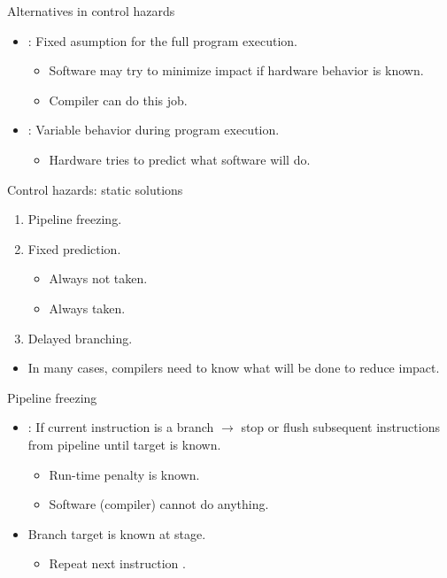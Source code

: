 \begin{frame}[t]{Alternatives in control hazards}
\begin{itemize}
  \item {}: Fixed asumption for the full program execution.
    \begin{itemize}
      \item Software may try to minimize impact if hardware behavior is known.
      \item Compiler can do this job.
    \end{itemize}

  \item {}: Variable behavior during program execution.
    \begin{itemize}
      \item Hardware tries to predict what software will do.
    \end{itemize}
\end{itemize}
\end{frame}

\begin{frame}[t]{Control hazards: static solutions}
\begin{enumerate}
  \item Pipeline freezing.
  \item Fixed prediction.
    \begin{itemize}
      \item Always not taken.
      \item Always taken.
    \end{itemize}
  \item Delayed branching.
\end{enumerate}

\begin{itemize}
  \item In many cases, compilers need to know what will be done to reduce impact.
\end{itemize}
\end{frame}

\begin{frame}[t]{Pipeline freezing}
\begin{itemize}
  \item {}: If current instruction is a branch
        $\rightarrow$ 
        stop or flush subsequent instructions from pipeline
        until target is known.
    \begin{itemize}
      \item Run-time penalty is known.
      \item Software (compiler) cannot do anything.
    \end{itemize}

    \item Branch target is known at  stage.
      \begin{itemize}
        \item Repeat next instruction .
      \end{itemize}
\end{itemize}
\end{frame}

